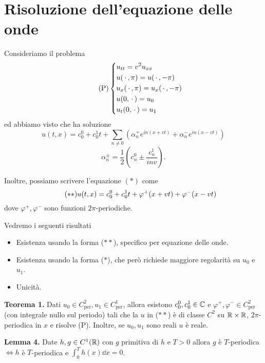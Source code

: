 
\section{Risoluzione dell'equazione delle onde}

Consideriamo il problema
\begin{equation}
	\tag{P}
	\left\{
	\begin{aligned}
			& u_{tt} = v^2 u_{xx} \\
			& u(\,\cdot\,, \pi) = u(\,\cdot\,, -\pi) \\
			& u_x(\,\cdot\,, \pi) = u_x(\,\cdot\,, -\pi) \\
			& u(0,\,\cdot\,) = u_0 \\
			& u_t(0,\,\cdot\,) = u_1
	\end{aligned}
	\right.
\end{equation}
ed abbiamo visto che ha soluzione
\begin{equation}
	\tag{$*$}
	u(t,x) = c_0^0 + c_0^1 t + \sum_{n \neq  0} (\alpha_n^+ e^{in(x + vt)} + \alpha_n^- e^{in(x - vt)})
\end{equation}
$$
	\alpha^{\pm}_n = \frac{1}{2}\left( c_n^0 \pm \frac{c^1_n}{i n v} \right).
$$

Inoltre, possiamo scrivere l'equazione $(*)$ come
\begin{equation}
	\tag{$**$}
	u(t,x) = c_0^0 + c_0^1 t + \varphi^+(x + vt) + \varphi^-(x - vt)
\end{equation}
dove $\varphi^+, \varphi^-$ sono funzioni $2\pi$-periodiche.

Vedremo i seguenti risultati

\begin{itemize}
	\item Esistenza usando la forma ($**$), specifico per equazione delle onde.
	\item Esistenza usando la forma ($*$), che però richiede maggiore regolarità su $u_0$ e $u_1$.
	\item Unicità.
\end{itemize}

\textbf{Teorema 1.}
Dati $u_0 \in C^2_{\text{per}}, u_1 \in C^1_{\text{per}}$, allora esistono $c_0^0, c_0^1 \in \mathbb C$ e $\varphi^+, \varphi^- \in C^2_{\text{per}}$ (con integrale nullo sul periodo) tali che la $u$ in ($**$) è di classe $C^2$ su $\mathbb R \times \mathbb R$, $2\pi$-periodica in $x$ e risolve (P). Inoltre, se $u_0,u_1$ sono reali $u$ è reale.

\textbf{Lemma 4.}
Date $h, g \in C^1(\mathbb R)$ con $g$ primitiva di $h$ e $T > 0$ allora $g$ è $T$-periodica $\iff h$ è $T$-periodica e $\int_0^T h(x) \dd x = 0$.


